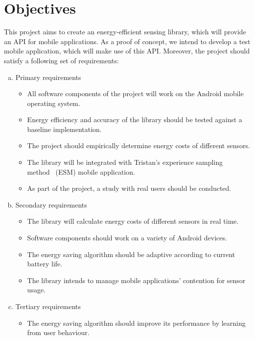 \documentclass[a4page]{article}
\begin{document}
\section{Objectives}
This project aims to create an energy-efficient sensing library, which will provide an API for mobile applications. As a proof of concept, we intend to develop a test mobile application, which will make use of this API. Moreover, the project should satisfy a following set of requirements:
\begin{enumerate}[(a)]
  \item Primary requirements
  \begin{itemize}
  	\item All software components of the project will work on the Android mobile operating 
system.
    \item Energy efficiency and accuracy of the library should be tested against a baseline 
implementation.
    \item The project should empirically determine energy costs of different sensors.
    \item The library will be integrated with Tristan's experience sampling method~ (ESM) mobile application.
    \item As part of the project, a study with real users should be conducted.
  \end{itemize}
  \item Secondary requirements
  \begin{itemize}
	\item The library will calculate energy costs of different sensors in real time.
  	\item Software components should work on a variety of Android devices.
    \item The energy saving algorithm should be adaptive according to current battery life.
    \item The library intends to manage mobile applications' contention for sensor usage.  
  \end{itemize}
  \item Tertiary requirements
  \begin{itemize}
  	\item The energy saving algorithm should improve its performance by learning from user behaviour. 
  \end{itemize}
\end{enumerate}
\end{document}
